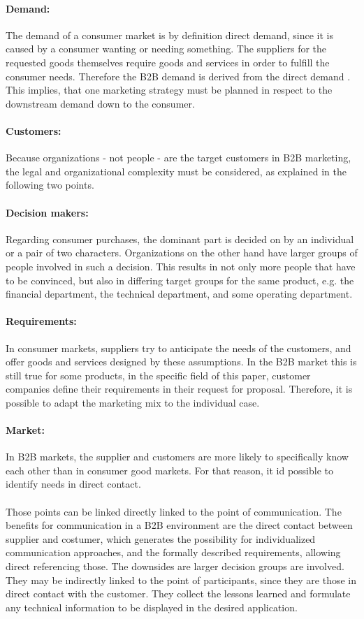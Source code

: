 \paragraph*{Demand:} The demand of a consumer market is by definition direct demand, since it is caused by a consumer wanting or needing something. The suppliers for the requested goods themselves require goods and services in order to fulfill the consumer needs. Therefore the B2B demand is derived from the direct demand \parencite[cf.][21]{Backhaus.2015b}. This implies, that one marketing strategy must be planned in respect to the downstream demand down to the consumer. 
\paragraph*{Customers:} Because organizations - not people - are the target customers in B2B marketing, the legal and organizational complexity must be considered, as explained in the following two points.
\paragraph*{Decision makers:}Regarding consumer purchases, the dominant part is decided on by an individual or a pair of two characters. Organizations on the other hand have larger groups of people involved in such a decision. This results in not only more people that have to be convinced, but also in differing target groups for the same product, e.g. the financial department, the technical department, and some operating department. 
\paragraph*{Requirements:}In consumer markets, suppliers try to anticipate the needs of the customers, and offer goods and services designed by these assumptions. In the B2B market this is still true for some products, in the specific field of this paper, customer companies define their requirements in their request for proposal. Therefore, it is possible to adapt the marketing mix to the individual case.
\paragraph*{Market:}In B2B markets, the supplier and customers are more likely to specifically know each other than in consumer good markets. For that reason, it id possible to identify needs in direct contact.
\paragraph*{} Those points can be linked directly linked to the point of communication. The benefits for communication in a B2B environment are  the direct contact between supplier and costumer, which generates the possibility for individualized communication approaches, and the formally described requirements, allowing direct referencing those. The downsides are larger decision groups are involved. They may be indirectly linked to the point of participants, since they are those in direct contact with the customer. They collect the lessons learned and formulate any technical information to be displayed in the desired application.
